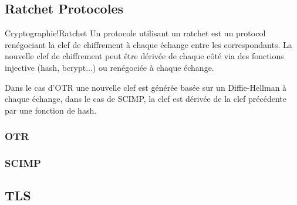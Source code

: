 \subsection{Ratchet Protocoles}
\begin{Define}{Cryptographie!Ratchet}
Un protocole utilisant un ratchet est un protocol renégociant la clef de chiffrement à chaque échange entre les correspondants. La nouvelle clef de chiffrement peut être dérivée de chaque côté via des fonctions injective (hash, bcrypt...) ou renégociée à chaque échange.
\end{Define}
Dans le cas d'\gls{OTR} une nouvelle clef est générée basée sur un Diffie-Hellman à chaque échange, dans le cas de \gls{SCIMP}, la clef est dérivée de la clef précédente par une fonction de hash.

\subsubsection{OTR}
\subsubsection{SCIMP}

\subsection{TLS}
